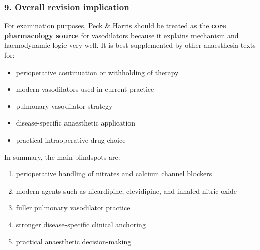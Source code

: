\documentclass[11pt,a4paper]{article}
\begin{document}
\subsubsection*{9. Overall revision implication}
For examination purposes, Peck \& Harris should be treated as the \textbf{core pharmacology source} for vasodilators because it explains mechanism and haemodynamic logic very well. It is best supplemented by other anaesthesia texts for:
\begin{itemize}
    \item perioperative continuation or withholding of therapy
    \item modern vasodilators used in current practice
    \item pulmonary vasodilator strategy
    \item disease-specific anaesthetic application
    \item practical intraoperative drug choice
\end{itemize}

In summary, the main blindspots are:
\begin{enumerate}
    \item perioperative handling of nitrates and calcium channel blockers
    \item modern agents such as nicardipine, clevidipine, and inhaled nitric oxide
    \item fuller pulmonary vasodilator practice
    \item stronger disease-specific clinical anchoring
    \item practical anaesthetic decision-making
\end{enumerate}
\end{document}
